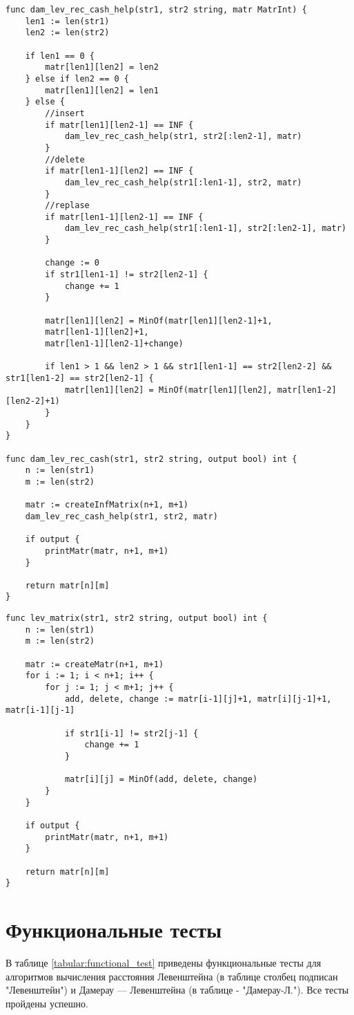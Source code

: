 \begin{lstlisting}[label=lst:lev_rec_mat,caption=Функция нахождения расстояния Дамерау--Левенштейна с использованием рекурсии с кешем.]
func dam_lev_rec_cash_help(str1, str2 string, matr MatrInt) {
	len1 := len(str1)
	len2 := len(str2)
	
	if len1 == 0 {
		matr[len1][len2] = len2
	} else if len2 == 0 {
		matr[len1][len2] = len1
	} else {
		//insert
		if matr[len1][len2-1] == INF {
			dam_lev_rec_cash_help(str1, str2[:len2-1], matr)
		}
		//delete
		if matr[len1-1][len2] == INF {
			dam_lev_rec_cash_help(str1[:len1-1], str2, matr)
		}
		//replase
		if matr[len1-1][len2-1] == INF {
			dam_lev_rec_cash_help(str1[:len1-1], str2[:len2-1], matr)
		}
		
		change := 0
		if str1[len1-1] != str2[len2-1] {
			change += 1
		}
		
		matr[len1][len2] = MinOf(matr[len1][len2-1]+1,
		matr[len1-1][len2]+1,
		matr[len1-1][len2-1]+change)
		
		if len1 > 1 && len2 > 1 && str1[len1-1] == str2[len2-2] && str1[len1-2] == str2[len2-1] {
			matr[len1][len2] = MinOf(matr[len1][len2], matr[len1-2][len2-2]+1)
		}
	}
}

func dam_lev_rec_cash(str1, str2 string, output bool) int {
	n := len(str1)
	m := len(str2)
	
	matr := createInfMatrix(n+1, m+1)
	dam_lev_rec_cash_help(str1, str2, matr)
	
	if output {
		printMatr(matr, n+1, m+1)
	}
	
	return matr[n][m]
}
\end{lstlisting}

\begin{lstlisting}[label=lst:dlev,caption=Функция нахождения расстояния Левенштейна с использованием итераций.]
func lev_matrix(str1, str2 string, output bool) int {
	n := len(str1)
	m := len(str2)
	
	matr := createMatr(n+1, m+1)
	for i := 1; i < n+1; i++ {
		for j := 1; j < m+1; j++ {
			add, delete, change := matr[i-1][j]+1, matr[i][j-1]+1, matr[i-1][j-1]
			
			if str1[i-1] != str2[j-1] {
				change += 1
			}
			
			matr[i][j] = MinOf(add, delete, change)
		}
	}
	
	if output {
		printMatr(matr, n+1, m+1)
	}
	
	return matr[n][m]
}
\end{lstlisting}

\section{Функциональные тесты}
В таблице \ref{tabular:functional_test} приведены функциональные тесты для алгоритмов вычисления расстояния Левенштейна (в таблице столбец подписан "Левенштейн") и Дамерау — Левенштейна (в таблице - "Дамерау-Л."). Все тесты пройдены успешно.


